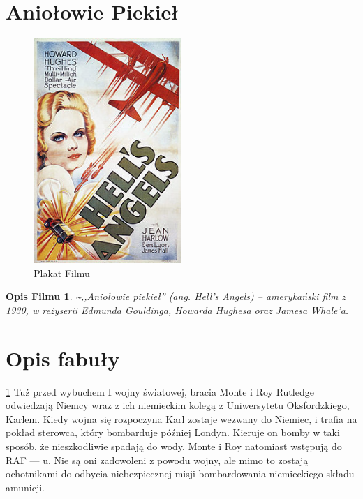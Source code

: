 ﻿\documentclass[32pt,a4paper]{article}
\author{Hubert Kozacz}
\newtheorem{theorem}{Opis Filmu}
\begin{document}
\begin{abstract}
Artykuł na temat filmu "Aniołowie piekieł"
\end{abstract}
\tableofcontents
\section{Aniołowie Piekieł}
\begin{large}
\begin{figure}[h!]
  \caption{Plakat Filmu}
  \centering
    \includegraphics[width=0.5\textwidth]{pics/Poster.jpg}
\end{figure}
\begin{theorem}
\label{film}
\~{},,Aniołowie piekieł'' (ang. Hell’s Angels) – amerykański film z 1930, w reżyserii Edmunda Gouldinga, Howarda Hughesa oraz Jamesa Whale’a.
\end{theorem}

\section{Opis fabuły}
\begin{large}
\ref{film}
Tuż przed wybuchem I wojny światowej, bracia Monte i Roy Rutledge odwiedzają Niemcy wraz z ich niemieckim kolegą z Uniwersytetu Oksfordzkiego, Karlem. Kiedy wojna się rozpoczyna Karl zostaje wezwany do Niemiec, i trafia na pokład sterowca, który bombarduje później Londyn. Kieruje on bomby w taki sposób, że nieszkodliwie spadają do wody. Monte i Roy natomiast wstępują do RAF --- u. Nie są oni zadowoleni z powodu wojny, ale mimo to zostają ochotnikami do odbycia niebezpiecznej misji bombardowania niemieckiego składu amunicji.

\end{large}
\end{large}
\end{document}
